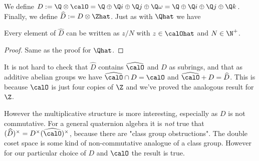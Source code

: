 We define $D:=\Q\otimes\calO=\Q\oplus\Q i\oplus\Q j\oplus\Q\omega=\Q\oplus\Q i\oplus\Q j\oplus\Q k$.
Finally, we define $\widehat{D}:=D\otimes\Zhat$. Just as with $\Qhat$ we have

\begin{lemma}
    \label{HurwitzRatHat.canonicalForm}
    \leanok
    Every element of $\widehat{D}$ can be written as $z/N$ with $z\in\calOhat$ and $N\in\N^+$.
\end{lemma}
\begin{proof}
    Same as the proof for $\Qhat$.
\end{proof}

It is not hard to check that $\widehat{D}$ contains $\widehat{\calO}$
and $D$ as subrings, and that as additive abelian groups we have
$\widehat{\calO}\cap D=\calO$ and $\widehat{\calO}+D=\widehat{D}$.
This is because $\calO$ is just four copies of $\Z$ and we've proved
the analogous result for $\Z$.

However the multiplicative structure is more interesting, especially
as $D$ is not commutative. For a general quaternion algebra it is \emph{not}
true that $(\widehat{D})^\times=D^\times(\widehat{\calO})^\times$, because
there are "class group obstructions". The double coset space is some
kind of non-commutative analogue of a class group. However for our
particular choice of $D$ and $\calO$ the result is true.

